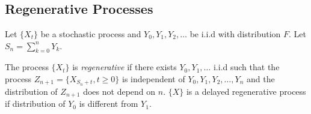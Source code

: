 \documentclass[all-lectures.tex]{subfiles}
\begin{document}

\setcounter{section}{4}
\setcounter{subsection}{0}

\section*{}
\subsection{Regenerative Processes}
Let $\{X_t\}$ be a stochastic process and $Y_0,Y_1,Y_2,\dots$ be i.i.d with distribution $F$. Let $S_n = \sum_{k=0}^n Y_k$.
\begin{defn}
The process $\{X_t\}$ is \textit{regenerative }if there exists $Y_0,Y_1,\dots$ i.i.d such that the process $Z_{n+1} = \{X_{S_n +t}, t\geq 0\}$ is independent of $Y_0,Y_1,Y_2,\dots,Y_n$ and the distribution of $Z_{n+1}$ does not depend on $n$. $\{X\}$ is a delayed regenerative process if distribution of $Y_0$ is different from $Y_1$.
\end{defn}
\end{document}

